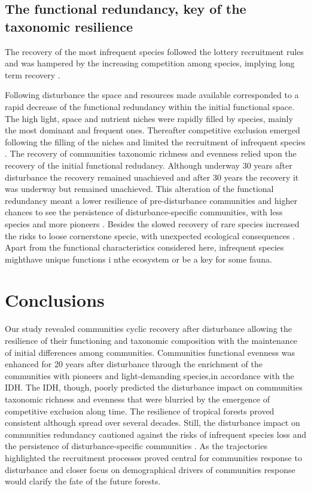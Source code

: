 \documentclass[fleqn,10pt]{ArtEcoFoG} %
\theoremstyle{definition}
\theoremstyle{definition}
\theoremstyle{definition}
\theoremstyle{remark}
\begin{document}
\subsection{The functional redundancy, key of the taxonomic
resilience}\label{the-functional-redundancy-key-of-the-taxonomic-resilience}

The recovery of the most infrequent species followed the lottery
recruitment rules \citep{Busing2002} and was hampered by the increasing
competition among species, implying long term recovery
\citep{Trenbath1999, Elmqvist2003, Diaz2005}.

Following disturbance the space and resources made available
corresponded to a rapid decrease of the functional redundancy within the
initial functional space. The high light, space and nutrient niches were
rapidly filled by species, mainly the most dominant and frequent ones.
Thereafter competitive exclusion emerged following the filling of the
niches and limited the recruitment of infrequent species
\citep{Busing2002}. The recovery of communities taxonomic richness and
evenness relied upon the recovery of the initial functional redudancy.
Although underway 30 years after disturbance the recovery remained
unachieved and after 30 years the recovery it was underway but remained
unachieved. This alteration of the functional redundancy meant a lower
resilience of pre-disturbance communities and higher chances to see the
persistence of disturbance-specific communities, with less species and
more pioneers \citep{Haddad2008, Burslem2000, Martin2013}. Besides the
slowed recovery of rare species increased the risks to loose cornerstone
specie, with unexpected ecological consequences
\citep{Jones1994, Chazdon2003a, Diaz2005, Gardner2007}. Apart from the
functional characteristics considered here, infrequent species mighthave
unique functions i nthe ecosystem or be a key for some fauna.

\section{Conclusions}\label{conclusions}

Our study revealed communities cyclic recovery after disturbance
allowing the resilience of their functioning and taxonomic composition
with the maintenance of initial differences among communities.
Communities functional evenness was enhanced for 20 years after
disturbance through the enrichment of the communities with pioneers and
light-demanding species,in accordance with the IDH. The IDH, though,
poorly predicted the disturbance impact on communities taxonomic
richness and evenness that were blurried by the emergence of competitive
exclusion along time. The resilience of tropical forests proved
consistent although spread over several decades. Still, the disturbance
impact on communities redundancy cautioned against the risks of
infrequent species loss and the persistence of disturbance-specific
communities \citep{Gourlet-Fleury2005}. As the trajectories highlighted
the recruitment processes proved central for communities response to
disturbance and closer focus on demographical drivers of communities
response would clarify the fate of the future forests.
\end{document}
